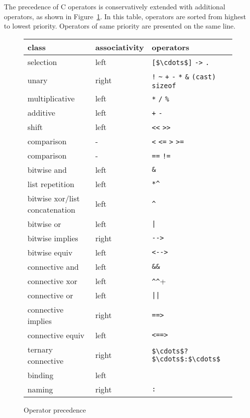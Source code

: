 The precedence of C operators is conservatively extended with
additional operators, as shown in Figure~\ref{fig:precedence}. In this
table, operators are sorted from highest to lowest priority. Operators
of same priority are presented on the same line.


\begin{figure}[t]
  \begin{center}
    \begin{tabular}{|l|l|l|}
      \hline
      class 	& associativity & operators \\
      \hline
      selection & left & \lstinline|[$\cdots$]| \lstinline|->| \lstinline|.| \\
      unary 	& right & \lstinline|!| \lstinline|~| \lstinline|+|
      \lstinline|-| \lstinline|*| \lstinline|&| \lstinline|(cast)|
      \lstinline|sizeof| \\
      multiplicative & left & \lstinline|*| \lstinline|/|  \lstinline|%| \\
      additive & left & \lstinline|+| \lstinline|-| \\
      shift 	& left & \lstinline|<<| \lstinline|>>| \\
      comparison & - & \lstinline|<| \lstinline|<=| \lstinline|>| \lstinline|>=| \\
      comparison & - & \lstinline|==| \lstinline|!=| \\
      bitwise and & left & \lstinline|&| \\
      list repetition & left & \lstinline|*^| \\
      bitwise xor/list concatenation & left & \lstinline|^| \\
      bitwise or & left & \lstinline+|+ \\
      bitwise implies & right & \lstinline+-->+ \\
      bitwise equiv & left & \lstinline+<-->+ \\
      connective and & left & \lstinline|&&| \\
      connective xor & left & \lstinline+^^+ \\
      connective or & left & \lstinline+||+ \\
      connective implies & right & \lstinline|==>| \\
      connective equiv & left & \lstinline|<==>| \\
      ternary connective & right & \lstinline|$\cdots$?$\cdots$:$\cdots$| \\
      binding & left & \Forall{} \Exists{} \Let{} \\
      naming & right & \lstinline|:| \\
      \hline
    \end{tabular}
  \end{center}
  \caption{Operator precedence}
\label{fig:precedence}
\end{figure}

